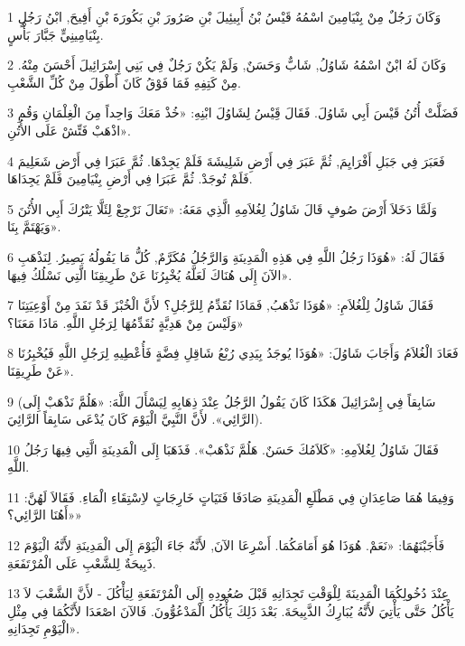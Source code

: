 \par 1 وَكَانَ رَجُلٌ مِنْ بِنْيَامِينَ اسْمُهُ قَيْسُ بْنُ أَبِيئِيلَ بْنِ صَرُورَ بْنِ بَكُورَةَ بْنِ أَفِيحَ, ابْنُ رَجُلٍ بِنْيَامِينِيٍّ جَبَّارَ بَأْسٍ.
\par 2 وَكَانَ لَهُ ابْنٌ اسْمُهُ شَاوُلُ, شَابٌّ وَحَسَنٌ, وَلَمْ يَكُنْ رَجُلٌ فِي بَنِي إِسْرَائِيلَ أَحْسَنَ مِنْهُ. مِنْ كَتِفِهِ فَمَا فَوْقُ كَانَ أَطْوَلَ مِنْ كُلِّ الشَّعْبِ.
\par 3 فَضَلَّتْ أُتُنُ قَيْسَ أَبِي شَاوُلَ. فَقَالَ قَِيْسُ لِشَاوُلَ ابْنِهِ: «خُذْ مَعَكَ وَاحِداً مِنَ الْغِلْمَانِ وَقُمِ اذْهَبْ فَتِّشْ عَلَى الأُتُنِ».
\par 4 فَعَبَرَ فِي جَبَلِ أَفْرَايِمَ, ثُمَّ عَبَرَ فِي أَرْضِ شَلِيشَةَ فَلَمْ يَجِدْهَا. ثُمَّ عَبَرَا فِي أَرْضِ شَعَلِيمَ فَلَمْ تُوجَدْ. ثُمَّ عَبَرَا فِي أَرْضِ بِنْيَامِينَ فَلَمْ يَجِدَاهَا.
\par 5 وَلَمَّا دَخَلاَ أَرْضَ صُوفٍ قَالَ شَاوُلُ لِغُلاَمِهِ الَّذِي مَعَهُ: «تَعَالَ نَرْجِعْ لِئَلَّا يَتْرُكَ أَبِي الأُتُنَ وَيَهْتَمَّ بِنَا».
\par 6 فَقَالَ لَهُ: «هُوَذَا رَجُلُ اللَّهِ فِي هَذِهِ الْمَدِينَةِ وَالرَّجُلُ مُكَرَّمٌ, كُلُّ مَا يَقُولُهُ يَصِيرُ. لِنَذْهَبِ الآنَ إِلَى هُنَاكَ لَعَلَّهُ يُخْبِرُنَا عَنْ طَرِيقِنَا الَّتِي نَسْلُكُ فِيهَا».
\par 7 فَقَالَ شَاوُلُ لِلْغُلاَمِ: «هُوَذَا نَذْهَبُ, فَمَاذَا نُقَدِّمُ لِلرَّجُلِ؟ لأَنَّ الْخُبْزَ قَدْ نَفَدَ مِنْ أَوْعِيَتِنَا وَلَيْسَ مِنْ هَدِيَّةٍ نُقَدِّمُهَا لِرَجُلِ اللَّهِ. مَاذَا مَعَنَا؟»
\par 8 فَعَادَ الْغُلاَمُ وَأَجَابَ شَاوُلَ: «هُوَذَا يُوجَدُ بِيَدِي رُبْعُ شَاقِلِ فِضَّةٍ فَأُعْطِيهِ لِرَجُلِ اللَّهِ فَيُخْبِرُنَا عَنْ طَرِيقِنَا».
\par 9 (سَابِقاً فِي إِسْرَائِيلَ هَكَذَا كَانَ يَقُولُ الرَّجُلُ عِنْدَ ذِهَابِهِ لِيَسْأَلَ اللَّهَ: «هَلُمَّ نَذْهَبْ إِلَى الرَّائِي». لأَنَّ النَّبِيَّ الْيَوْمَ كَانَ يُدْعَى سَابِقاً الرَّائِيَ).
\par 10 فَقَالَ شَاوُلُ لِغُلاَمِهِ: «كَلاَمُكَ حَسَنٌ. هَلُمَّ نَذْهَبْ». فَذَهَبَا إِلَى الْمَدِينَةِ الَّتِي فِيهَا رَجُلُ اللَّهِ.
\par 11 وَفِيمَا هُمَا صَاعِدَانِ فِي مَطْلَعِ الْمَدِينَةِ صَادَفَا فَتَيَاتٍ خَارِجَاتٍ لاِسْتِقَاءِ الْمَاءِ. فَقَالاَ لَهُنَّ: «أَهُنَا الرَّائِي؟»
\par 12 فَأَجَبْنَهُمَا: «نَعَمْ. هُوَذَا هُوَ أَمَامَكُمَا. أَسْرِعَا الآنَ, لأَنَّهُ جَاءَ الْيَوْمَ إِلَى الْمَدِينَةِ لأَنَّهُ الْيَوْمَ ذَبِيحَةٌ لِلشَّعْبِ عَلَى الْمُرْتَفَعَةِ.
\par 13 عِنْدَ دُخُولِكُمَا الْمَدِينَةَ لِلْوَقْتِ تَجِدَانِهِ قَبْلَ صُعُودِهِ إِلَى الْمُرْتَفَعَةِ لِيَأْكُلَ - لأَنَّ الشَّعْبَ لاَ يَأْكُلُ حَتَّى يَأْتِيَ لأَنَّهُ يُبَارِكُ الذَّبِيحَةَ. بَعْدَ ذَلِكَ يَأْكُلُ الْمَدْعُوُّونَ. فَالآنَ اصْعَدَا لأَنَّكُمَا فِي مِثْلِ الْيَوْمِ تَجِدَانِهِ».
